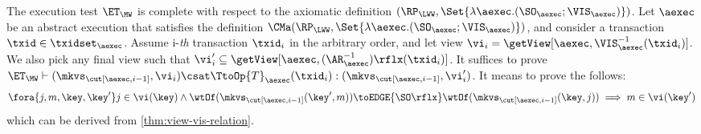 
The execution test $\ET_{\MW}$ is complete with respect to 
the axiomatic definition $(\RP_{\LWW}, \Set{\lambda \aexec.(\SO_{\aexec} ; \VIS_{\aexec})})$. 
Let $\aexec$ be an abstract execution that satisfies the definition
$\CMa(\RP_{\LWW}, \Set{\lambda \aexec.(\SO_{\aexec} ; \VIS_{\aexec})})$, 
and consider a transaction $\txid \in \txidset_{\aexec}$. 
Assume i-\emph{th} transaction \( \txid_i \) in the arbitrary order,
and let view \( \vi_{i} = \getView[\aexec, \VIS^{-1}_{\aexec}(\txid_{i})] \).
We also pick any final view such that \( \vi'_{i} \subseteq \getView[\aexec, (\AR^{-1}_{\aexec})\rflx(\txid_{i})] \).
It suffices to prove \( \ET_\MW \vdash (\mkvs_{\cut[\aexec, i-1]}, \vi_i ) \csat  \TtoOp{T}_{\aexec}(\txid_{i}) : (\mkvs_{\cut[\aexec, i-1]}, \vi'_{i}) \).
It means to prove the follows:
\begin{equation}
\label{equ:mw-complete}
\begin{array}{@{}l@{}}
    \fora{j,m,\key, \key' } j \in \vi(\key)  
    \land \wtOf(\mkvs_{\cut[\aexec, i-1]}(\key', m)) \toEDGE{\SO\rflx} \wtOf(\mkvs_{\cut[\aexec, i-1]}(\key, j))  
    \implies m \in \vi(\key')
\end{array}
\end{equation}
which can be derived from \cref{thm:view-vis-relation}.
